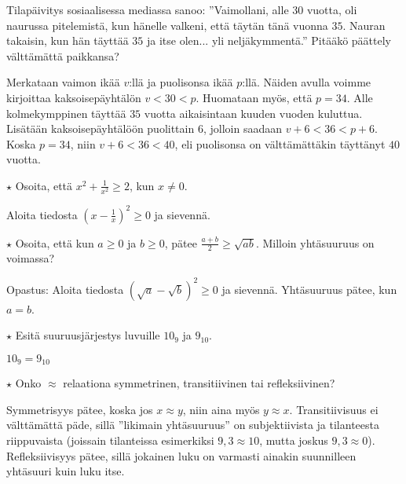 \begin{tehtavasivu}
\begin{tehtava}
Tilapäivitys sosiaalisessa mediassa sanoo: ''Vaimollani, alle $30$ vuotta, oli naurussa pitelemistä, kun hänelle valkeni, että täytän tänä vuonna $35$. Nauran takaisin, kun hän täyttää $35$ ja itse olen... yli neljäkymmentä.'' Pitääkö päättely välttämättä paikkansa?
		\begin{vastaus}
		Merkataan vaimon ikää $v$:llä ja puolisonsa ikää $p$:llä. Näiden avulla voimme kirjoittaa kaksoisepäyhtälön $v<30<p$. Huomataan myös, että $p=34$. Alle kolmekymppinen täyttää $35$ vuotta aikaisintaan kuuden vuoden kuluttua. Lisätään kaksoisepäyhtälöön puolittain $6$, jolloin saadaan $v+6<36<p+6$. Koska $p=34$, niin $v+6<36<40$, eli puolisonsa on välttämättäkin täyttänyt $40$ vuotta.
		\end{vastaus}
\end{tehtava}

\begin{tehtava}
$\star$ Osoita, että $x^2+\frac{1}{x^2}\geq 2$, kun $x \neq 0$.
    \begin{vastaus}
     Aloita tiedosta $\left(x-\frac{1}{x}\right)^2 \geq 0$ ja sievennä.
    \end{vastaus}
\end{tehtava}

\begin{tehtava} 
$\star$ Osoita, että kun $a \geq 0$ ja $b \geq 0$, pätee $\frac{a+b}{2} \geq \sqrt{ab}$. Milloin yhtäsuuruus on voimassa?
    \begin{vastaus}
     Opastus: Aloita tiedosta $\left(\sqrt{a}-\sqrt{b}\right)^2 \geq 0$ ja sievennä. Yhtäsuuruus pätee, kun $a = b$.
    \end{vastaus}
\end{tehtava}

\begin{tehtava}
$\star$ Esitä suuruusjärjestys luvuille $10_9$ ja $9_{10}$.
	\begin{vastaus}
	$10_9=9_{10}$
	\end{vastaus}
\end{tehtava}

\begin{tehtava}
$\star$ Onko $\approx$ relaationa symmetrinen, transitiivinen tai refleksiivinen?
	\begin{vastaus}
Symmetrisyys pätee, koska jos $x\approx y$, niin aina myös $y\approx x$. Transitiivisuus ei välttämättä päde, sillä ''likimain yhtäsuuruus'' on subjektiivista ja tilanteesta riippuvaista (joissain tilanteissa esimerkiksi $9,3\approx 10$, mutta joskus $9,3 \approx 0$). Refleksiivisyys pätee, sillä jokainen luku on varmasti ainakin suunnilleen yhtäsuuri kuin luku itse.
	\end{vastaus}
\end{tehtava}

\end{tehtavasivu}